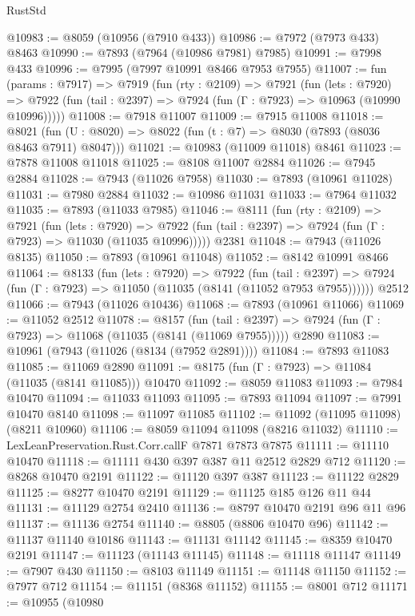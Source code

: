 \begin{lexlean}{RustStd}
\begin{coremodule}
{\begin{coremodule}
{{{{{{{{{{{{{{{{{{{{{{{{{{{{{{{{{{{{{{{{{{{{{{{{{{@10983 := @8059 (@10956 (@7910 @433))
@10986 := @7972 (@7973 @433) @8463
@10990 := @7893 (@7964 (@10986 @7981) @7985)
@10991 := @7998 @433
@10996 := @7995 (@7997 @10991 @8466 @7953 @7955)
@11007 := fun (params : @7917) =>
  @7919
    (fun (rty : @2109) =>
    @7921
      (fun (lets : @7920) =>
      @7922 (fun (tail : @2397) => @7924 (fun (Γ : @7923) => @10963 (@10990 @10996)))))
@11008 := @7918 @11007
@11009 := @7915 @11008
@11018 := @8021 (fun (U : @8020) => @8022 (fun (t : @7) => @8030 (@7893 (@8036 @8463 @7911) @8047)))
@11021 := @10983 (@11009 @11018) @8461
@11023 := @7878 @11008 @11018
@11025 := @8108 @11007 @2884
@11026 := @7945 @2884
@11028 := @7943 (@11026 @7958)
@11030 := @7893 (@10961 @11028)
@11031 := @7980 @2884
@11032 := @10986 @11031
@11033 := @7964 @11032
@11035 := @7893 (@11033 @7985)
@11046 := @8111
    (fun (rty : @2109) =>
    @7921
      (fun (lets : @7920) =>
      @7922 (fun (tail : @2397) => @7924 (fun (Γ : @7923) => @11030 (@11035 @10996)))))
    @2381
@11048 := @7943 (@11026 @8135)
@11050 := @7893 (@10961 @11048)
@11052 := @8142 @10991 @8466
@11064 := @8133
    (fun (lets : @7920) =>
    @7922
      (fun (tail : @2397) =>
      @7924 (fun (Γ : @7923) => @11050 (@11035 (@8141 (@11052 @7953 @7955))))))
    @2512
@11066 := @7943 (@11026 @10436)
@11068 := @7893 (@10961 @11066)
@11069 := @11052 @2512
@11078 := @8157
    (fun (tail : @2397) => @7924 (fun (Γ : @7923) => @11068 (@11035 (@8141 (@11069 @7955)))))
    @2890
@11083 := @10961 (@7943 (@11026 (@8134 (@7952 @2891))))
@11084 := @7893 @11083
@11085 := @11069 @2890
@11091 := @8175 (fun (Γ : @7923) => @11084 (@11035 (@8141 @11085))) @10470
@11092 := @8059 @11083
@11093 := @7984 @10470
@11094 := @11033 @11093
@11095 := @7893 @11094
@11097 := @7991 @10470 @8140
@11098 := @11097 @11085
@11102 := @11092 (@11095 @11098) (@8211 @10960)
@11106 := @8059 @11094 @11098 (@8216 @11032)
@11110 := LexLeanPreservation.Rust.Corr.callF @7871 @7873 @7875
@11111 := @11110 @10470
@11118 := @11111 @430 @397 @387 @11 @2512 @2829 @712
@11120 := @8268 @10470 @2191
@11122 := @11120 @397 @387
@11123 := @11122 @2829
@11125 := @8277 @10470 @2191
@11129 := @11125 @185 @126 @11 @44
@11131 := @11129 @2754 @2410
@11136 := @8797 @10470 @2191 @96 @11 @96
@11137 := @11136 @2754
@11140 := @8805 (@8806 @10470 @96)
@11142 := @11137 @11140 @10186
@11143 := @11131 @11142
@11145 := @8359 @10470 @2191
@11147 := @11123 (@11143 @11145)
@11148 := @11118 @11147
@11149 := @7907 @430
@11150 := @8103 @11149
@11151 := @11148 @11150
@11152 := @7977 @712
@11154 := @11151 (@8368 @11152)
@11155 := @8001 @712
@11171 := @10955
    (@10980
}}}}}}}}}}}}}}}}}}}}}}}}}}}}}}}}}}}}}}}}}}}}}}}}}}
\end{coremodule}}
\end{coremodule}
\end{lexlean}
